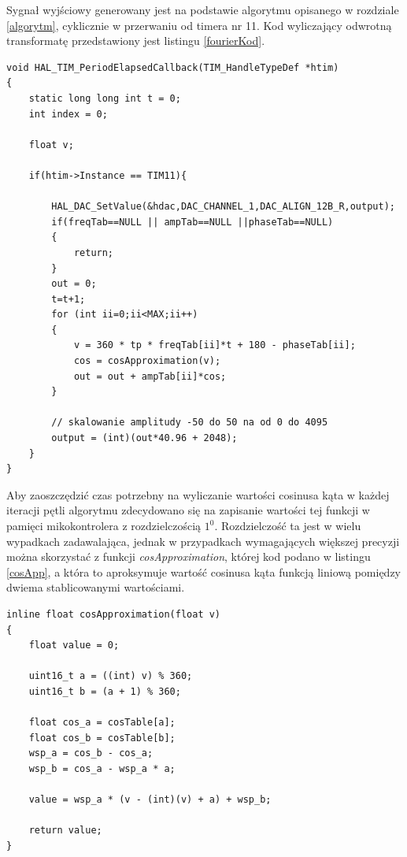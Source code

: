 Sygnał wyjściowy generowany jest na podstawie algorytmu opisanego w rozdziale \ref{algorytm}, cyklicznie w przerwaniu od timera nr 11. Kod wyliczający odwrotną transformatę przedstawiony jest listingu \ref{fourierKod}. 
%
\begin{lstlisting}[frame=single, caption = Kod funkcji obliczającej odwrotną transformatę Fouriera w przerwaniu od timera 11., label = fourierKod]
void HAL_TIM_PeriodElapsedCallback(TIM_HandleTypeDef *htim)
{
	static long long int t = 0;
	int index = 0;
	
	float v;
	
	if(htim->Instance == TIM11){
	
		HAL_DAC_SetValue(&hdac,DAC_CHANNEL_1,DAC_ALIGN_12B_R,output);
		if(freqTab==NULL || ampTab==NULL ||phaseTab==NULL)
		{
			return;
		}
		out = 0;
		t=t+1;
		for (int ii=0;ii<MAX;ii++)
		{
			v = 360 * tp * freqTab[ii]*t + 180 - phaseTab[ii];
			cos = cosApproximation(v);
			out = out + ampTab[ii]*cos;
		}
		
		// skalowanie amplitudy -50 do 50 na od 0 do 4095
		output = (int)(out*40.96 + 2048);
	}
}
\end{lstlisting}
%
Aby zaoszczędzić czas potrzebny na wyliczanie wartości cosinusa kąta w każdej iteracji pętli algorytmu zdecydowano się na zapisanie wartości tej funkcji w pamięci mikokontrolera z rozdzielczością $1^0$. Rozdzielczość ta jest w wielu wypadkach zadawalająca, jednak w przypadkach wymagających większej precyzji można skorzystać z funkcji \mbox{\textit{cosApproximation}}, której kod podano w listingu \ref{cosApp}, a która to aproksymuje wartość cosinusa kąta funkcją liniową pomiędzy dwiema stablicowanymi wartościami. \\

\begin{lstlisting}[frame=single, caption = Funkcja aproksymująca wartość cosinusa., label = cosApp]
inline float cosApproximation(float v)
{
	float value = 0;
	
	uint16_t a = ((int) v) % 360;
	uint16_t b = (a + 1) % 360;
	
	float cos_a = cosTable[a];
	float cos_b = cosTable[b];
	wsp_a = cos_b - cos_a;
	wsp_b = cos_a - wsp_a * a;
	
	value = wsp_a * (v - (int)(v) + a) + wsp_b;
	
	return value;
}
\end{lstlisting}
